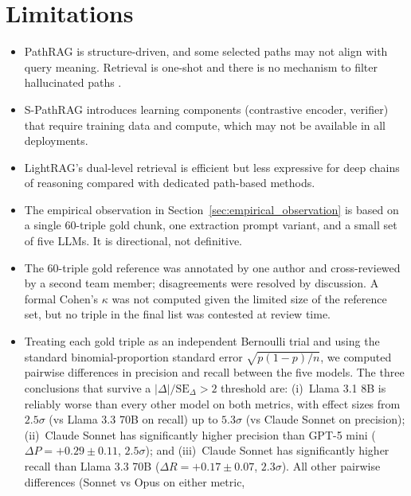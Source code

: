 \documentclass[12pt,a4paper,oneside]{report}
\begin{document}
\section{Limitations}

\begin{itemize}[leftmargin=2em,itemsep=2pt]
    \item PathRAG is structure-driven, and some selected paths may not align
          with query meaning. Retrieval is one-shot and there is no
          mechanism to filter hallucinated paths \citep{chen2025pathrag}.
    \item S-PathRAG introduces learning components (contrastive encoder,
          verifier) that require training data and compute, which may not
          be available in all deployments.
    \item LightRAG's dual-level retrieval is efficient but less expressive
          for deep chains of reasoning compared with dedicated path-based
          methods.
    \item The empirical observation in
          Section~\ref{sec:empirical_observation} is based on a single
          60-triple gold chunk, one extraction prompt variant, and a
          small set of five LLMs. It is directional, not definitive.
    \item The 60-triple gold reference was annotated by one author and
          cross-reviewed by a second team member; disagreements were
          resolved by discussion. A formal Cohen's $\kappa$ was not
          computed given the limited size of the reference set, but
          no triple in the final list was contested at review time.
    \item Treating each gold triple as an independent Bernoulli trial
          and using the standard binomial-proportion standard error
          $\sqrt{p(1-p)/n}$, we computed pairwise differences in
          precision and recall between the five models. The three
          conclusions that survive a $|\Delta| / \mathrm{SE}_\Delta
          > 2$ threshold are: (i)~Llama 3.1 8B is reliably worse than
          every other model on both metrics, with effect sizes from
          $2.5\sigma$ (vs Llama 3.3 70B on recall) up to $5.3\sigma$
          (vs Claude Sonnet on precision); (ii)~Claude Sonnet has
          significantly higher precision than GPT-5 mini
          ($\Delta P = +0.29 \pm 0.11$, $2.5\sigma$); and (iii)~Claude
          Sonnet has significantly higher recall than Llama 3.3 70B
          ($\Delta R = +0.17 \pm 0.07$, $2.3\sigma$). All other
          pairwise differences (Sonnet vs Opus on either metric,

\end{itemize}
\end{document}
